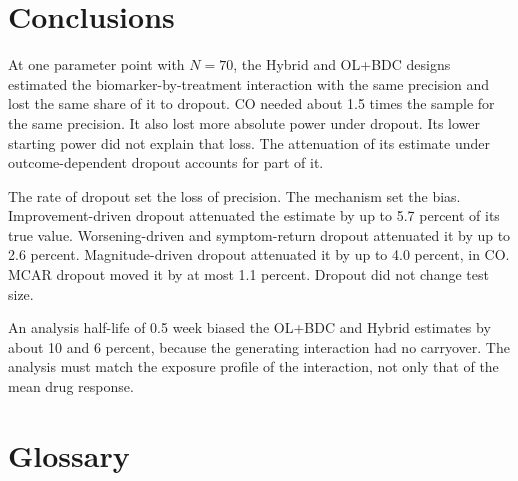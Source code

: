 \documentclass[
  11pt,
]{article}
\begin{document}
\section{Conclusions}\label{sec-conclusions}

At one parameter point with \(N = 70\), the Hybrid and
OL+BDC designs estimated the biomarker-by-treatment interaction with
the same precision and lost the same share of it to dropout. CO needed
about 1.5 times the sample for the same
precision. It also lost more absolute power under dropout. Its lower
starting power did not explain that loss. The attenuation of its
estimate under outcome-dependent dropout accounts for part of it.

The rate of dropout set the loss of precision. The mechanism set the
bias. Improvement-driven dropout attenuated the estimate by up to
5.7
percent of its true value. Worsening-driven and symptom-return dropout
attenuated it by up to
2.6
percent. Magnitude-driven dropout attenuated it by up to
4.0
percent, in CO. MCAR dropout moved it by at most
1.1
percent. Dropout did not change test size.

An analysis half-life of 0.5 week biased the OL+BDC and Hybrid
estimates by about
10 and
6 percent,
because the generating interaction had no carryover. The analysis must
match the exposure profile of the interaction, not only that of the
mean drug response.

\section*{Glossary}\label{glossary}
\end{document}
